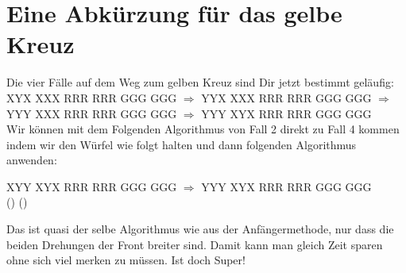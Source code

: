\section{Eine Abkürzung für das gelbe Kreuz}
Die vier Fälle auf dem Weg zum gelben Kreuz sind Dir jetzt bestimmt geläufig:\\[1em]
\RubikCubeGreyAll%
            {X}{Y}{X}
            {X}{X}{X}%
               {R}{R}{R}
	       {R}{R}{R}%
	       {G}{G}{G}
	       {G}{G}{G}%
$\Longrightarrow$
\RubikCubeGreyAll%
            {Y}{Y}{X}
            {X}{X}{X}%
               {R}{R}{R}
	       {R}{R}{R}%
	       {G}{G}{G}
	       {G}{G}{G}%
$\Longrightarrow$
\RubikCubeGreyAll%
            {Y}{Y}{Y}
            {X}{X}{X}%
               {R}{R}{R}
	       {R}{R}{R}%
	       {G}{G}{G}
	       {G}{G}{G}%
$\Longrightarrow$
\RubikCubeGreyAll%
            {Y}{Y}{Y}
            {X}{Y}{X}%
               {R}{R}{R}
	       {R}{R}{R}%
	       {G}{G}{G}
	       {G}{G}{G}%
\\[1em]

Wir können mit dem Folgenden Algorithmus von Fall 2 direkt zu Fall 4 kommen indem wir den Würfel wie folgt halten und dann folgenden Algorithmus anwenden:
\begin{center}
  \RubikCubeGreyAll%
	      {X}{Y}{Y}
	      {X}{Y}{X}%
		 {R}{R}{R}
		 {R}{R}{R}%
		 {G}{G}{G}
		 {G}{G}{G}%
  $\Longrightarrow$
  \RubikCubeGreyAll%
	      {Y}{Y}{Y}
	      {X}{Y}{X}%
		 {R}{R}{R}
		 {R}{R}{R}%
		 {G}{G}{G}
		 {G}{G}{G}%
  \\[2em]
  \sffamily\Large () ()
\end{center}

Das ist quasi der selbe Algorithmus wie aus der Anfängermethode, nur dass die beiden Drehungen der Front breiter sind.
Damit kann man gleich Zeit sparen ohne sich viel merken zu müssen. Ist doch Super!
